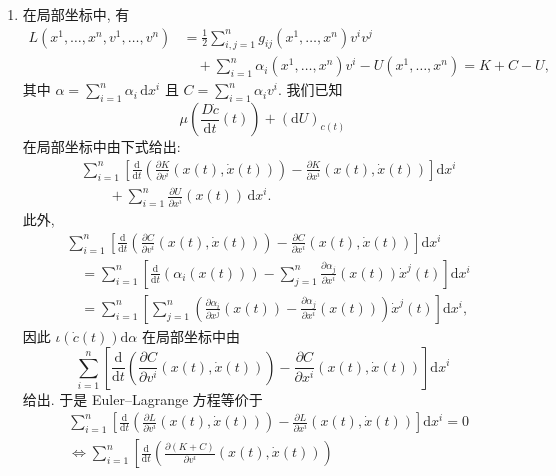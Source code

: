 \begin{description}[font=\normalfont,leftmargin=2em,labelwidth=1.5em]
\begin{enumerate}[label=(\alph*),ref=\alph*,leftmargin=*]
\item 在局部坐标中, 有
\begin{align*}
  L(x^1,\ldots,x^n,v^1,\ldots,v^n)
  &=\frac12\sum_{i,j=1}^n g_{ij}(x^1,\ldots,x^n)v^iv^j\\
  &\quad+\sum_{i=1}^n\alpha_i(x^1,\ldots,x^n)v^i-U(x^1,\ldots,x^n)
     =K+C-U,
\end{align*}
其中 $\alpha=\sum_{i=1}^n\alpha_i\,\mathrm{d}x^i$ 且 $C=\sum_{i=1}^n\alpha_i v^i$. 我们已知
\[
  \mu\left(\frac{D\dot c}{\mathrm{d}t}(t)\right)+(\mathrm{d}U)_{c(t)}
\]
在局部坐标中由下式给出:
\begin{align*}
  &\sum_{i=1}^n\left[\frac{\mathrm{d}}{\mathrm{d}t}
    \left(\frac{\partial K}{\partial v^i}(x(t),\dot{x}(t))\right)
    -\frac{\partial K}{\partial x^i}(x(t),\dot{x}(t))\right]\mathrm{d}x^i\\
  &\qquad+\sum_{i=1}^n\frac{\partial U}{\partial x^i}(x(t))\,\mathrm{d}x^i.
\end{align*}
此外,
\begin{align*}
  &\sum_{i=1}^n\left[\frac{\mathrm{d}}{\mathrm{d}t}
    \left(\frac{\partial C}{\partial v^i}(x(t),\dot{x}(t))\right)
    -\frac{\partial C}{\partial x^i}(x(t),\dot{x}(t))\right]\mathrm{d}x^i\\
  &\quad=\sum_{i=1}^n\left[\frac{\mathrm{d}}{\mathrm{d}t}(\alpha_i(x(t)))
        -\sum_{j=1}^n\frac{\partial\alpha_j}{\partial x^i}(x(t))\dot{x}^j(t)\right]\mathrm{d}x^i\\
  &\quad=\sum_{i=1}^n\left[\sum_{j=1}^n\left(\frac{\partial\alpha_i}{\partial x^j}(x(t))
      -\frac{\partial\alpha_j}{\partial x^i}(x(t))\right)\dot{x}^j(t)\right]\mathrm{d}x^i,
\end{align*}
因此 $\iota(\dot c(t))\mathrm{d}\alpha$ 在局部坐标中由
\[
  \sum_{i=1}^n\left[\frac{\mathrm{d}}{\mathrm{d}t}\left(\frac{\partial C}{\partial v^i}(x(t),\dot{x}(t))\right)
    -\frac{\partial C}{\partial x^i}(x(t),\dot{x}(t))\right]\mathrm{d}x^i
\]
给出. 于是 Euler–Lagrange 方程等价于
\begin{align*}
  &\sum_{i=1}^n\left[\frac{\mathrm{d}}{\mathrm{d}t}
      \left(\frac{\partial L}{\partial v^i}(x(t),\dot{x}(t))\right)
        -\frac{\partial L}{\partial x^i}(x(t),\dot{x}(t))\right]\mathrm{d}x^i=0\\
  &\iff \sum_{i=1}^n\left[\frac{\mathrm{d}}{\mathrm{d}t}
      \left(\frac{\partial(K+C)}{\partial v^i}(x(t),\dot{x}(t))\right)\right.\\

\end{align*}
\end{enumerate}
\end{description}

